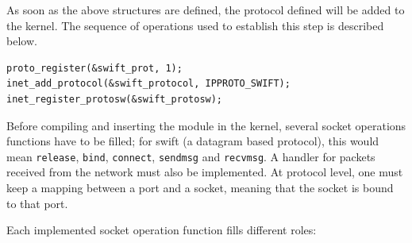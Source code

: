 As soon as the above structures are defined, the protocol defined will be
added to the kernel. The sequence of operations used to establish this step is
described below.

\begin{verbatim}
proto_register(&swift_prot, 1);
inet_add_protocol(&swift_protocol, IPPROTO_SWIFT);
inet_register_protosw(&swift_protosw);
\end{verbatim}

Before compiling and inserting the module in the kernel, several socket
operations functions have to be filled; for swift (a datagram based protocol),
this would mean \texttt{release}, \texttt{bind}, \texttt{connect},
\texttt{sendmsg} and \texttt{recvmsg}. A handler for packets received from the
network must also be implemented. At protocol level, one must keep a mapping
between a port and a socket, meaning that the socket is bound to that port.

Each implemented socket operation function fills different roles:

